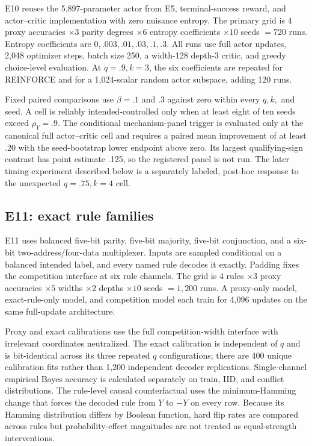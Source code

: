 \documentclass[11pt,a4paper]{article}
\newcommand{\rhoY}{\rho_Y}
\begin{document}
E10 reuses the 5,897-parameter actor from E5, terminal-success reward, and actor--critic implementation with zero nuisance entropy. The primary grid is $4$ proxy accuracies $\times3$ parity degrees $\times6$ entropy coefficients $\times10$ seeds $=720$ runs. Entropy coefficients are $0,.003,.01,.03,.1,.3$. All runs use full actor updates, 2,048 optimizer steps, batch size 250, a width-128 depth-3 critic, and greedy choice-level evaluation. At $q=.9,k=3$, the six coefficients are repeated for REINFORCE and for a 1,024-scalar random actor subspace, adding 120 runs.

Fixed paired comparisons use $\beta=.1$ and $.3$ against zero within every $q,k,$ and seed. A cell is reliably intended-controlled only when at least eight of ten seeds exceed $\rhoY=.9$. The conditional mechanism-panel trigger is evaluated only at the canonical full actor--critic cell and requires a paired mean improvement of at least .20 with the seed-bootstrap lower endpoint above zero. Its largest qualifying-sign contrast has point estimate .125, so the registered panel is not run. The later timing experiment described below is a separately labeled, post-hoc response to the unexpected $q=.75,k=4$ cell.

\subsection{E11: exact rule families}

E11 uses balanced five-bit parity, five-bit majority, five-bit conjunction, and a six-bit two-address/four-data multiplexer. Inputs are sampled conditional on a balanced intended label, and every named rule decodes it exactly. Padding fixes the competition interface at six rule channels. The grid is $4$ rules $\times3$ proxy accuracies $\times5$ widths $\times2$ depths $\times10$ seeds $=1{,}200$ runs. A proxy-only model, exact-rule-only model, and competition model each train for 4,096 updates on the same full-update architecture.

Proxy and exact calibrations use the full competition-width interface with irrelevant coordinates neutralized. The exact calibration is independent of $q$ and is bit-identical across its three repeated $q$ configurations; there are 400 unique calibration fits rather than 1,200 independent decoder replications. Single-channel empirical Bayes accuracy is calculated separately on train, IID, and conflict distributions. The rule-level causal counterfactual uses the minimum-Hamming change that forces the decoded rule from $Y$ to $-Y$ on every row. Because its Hamming distribution differs by Boolean function, hard flip rates are compared across rules but probability-effect magnitudes are not treated as equal-strength interventions.
\end{document}

